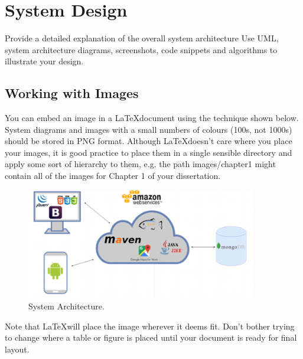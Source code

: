 \chapter{System Design}
Provide a detailed explanation of the overall system architecture %
Use UML, system architecture diagrams, screenshots, code snippets and algorithms to illustrate your design.

\section{Working with Images}
You can embed an image in a \LaTeX document using the technique shown below. System diagrams and images with a small numbers of 
colours (100s, not 1000s) should be stored in PNG format. Although \LaTeX doesn't care where you place your images, it is good 
practice to place them in a single sensible directory and apply some sort of hierarchy to them, e.g. the path images/chapter1 
might contain all of the images for Chapter 1 of your dissertation.

\begin{figure}[h!]
    \includegraphics[width=0.9\textwidth]{images/architecture.png}
    \caption{System Architecture.}
    \label{image:sysArchitecture}
\end{figure}

Note that \LaTeX will place the image wherever it deems fit. Don't bother trying to change where a table or figure is placed until your document is ready for final layout.